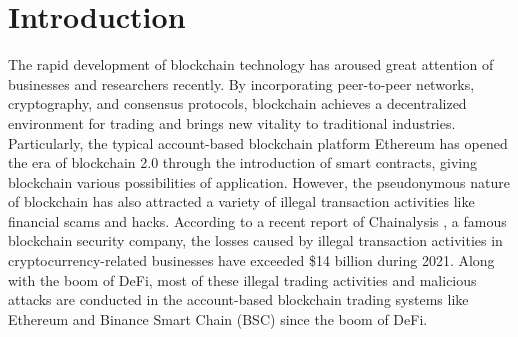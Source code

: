 \section{Introduction}
The rapid development of blockchain technology has aroused great attention of businesses and researchers recently. By incorporating peer-to-peer networks, cryptography, and consensus protocols, blockchain \cite{zheng2018blockchain} achieves a decentralized environment for trading and brings new vitality to traditional industries. Particularly, the typical account-based blockchain platform Ethereum has opened the era of blockchain 2.0 through the introduction of smart contracts, giving blockchain various possibilities of application. However, the pseudonymous nature of blockchain has also attracted a variety of illegal transaction activities like financial scams and hacks.
According to a recent report of Chainalysis \cite{chainalysis2022crime}, a famous blockchain security company, the losses caused by illegal transaction activities in cryptocurrency-related businesses have exceeded \$14 billion during 2021. Along with the boom of DeFi, most of these illegal trading activities and malicious attacks are conducted in the account-based blockchain trading systems like Ethereum and Binance Smart Chain (BSC) \cite{binancesmartchain} since the boom of DeFi.

